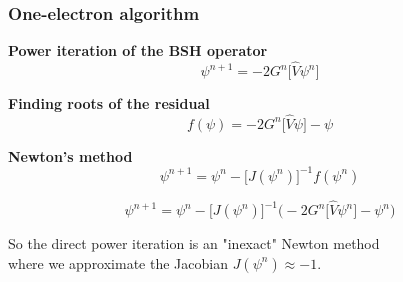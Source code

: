 \documentclass[mathserif, 10pt]{beamer}
\begin{document}
\begin{frame}
    \frametitle{One-electron algorithm}
    \centering
    \textbf{Power iteration of the BSH operator}
    \begin{equation}
	\nonumber
	\psi^{n+1} = -2G^n\Big[\hat{V} \psi^n\Big]
    \end{equation}

    \vspace{3mm}

    \textbf{Finding roots of the residual}
    \begin{equation}
	\nonumber
	f(\psi) = -2G^n\big[\hat{V} \psi\big] -\psi
    \end{equation}

    \vspace{3mm}

    \textbf{Newton's method}
    \begin{equation}
	\nonumber
	\psi^{n+1} = \psi^n - \Big[J(\psi^n)\Big]^{-1} f(\psi^n)
    \end{equation}

    \begin{equation}
	\nonumber
	\psi^{n+1} = \psi^n - \Big[J(\psi^n)\Big]^{-1}
	\bigg(-2G^n\Big[\hat{V}\psi^n\Big] - \psi^n\bigg)
    \end{equation}

    \vspace{3mm}

    So the direct power iteration is an "inexact" Newton method\\
    where we approximate the Jacobian $J(\psi^n) \approx -1$.
\end{frame}
\end{document}
